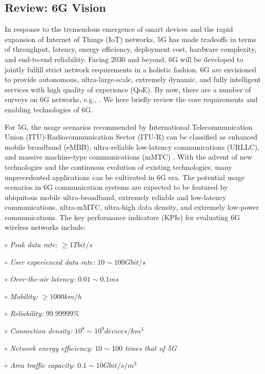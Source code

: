 \documentclass[journal,comsoc]{IEEEtran}
\begin{document}
\subsection{Review: 6G Vision}
In response to the tremendous emergence of smart devices and the rapid expansion of Internet of Things (IoT) networks, 5G has made tradeoffs in terms of throughput, latency, energy efficiency, deployment cost, hardware complexity, and end-to-end reliability. Facing 2030 and beyond, 6G will be developed to jointly fulfill strict network requirements in a holistic fashion. 6G are envisioned to provide autonomous, ultra-large-scale, extremely dynamic, and fully intelligent services with high quality of experience (QoE). By now, there are a number of surveys on 6G networks, e.g.,  \cite{6G-Wireless-Networks-MVT-2019,A-Vision-6G-MNET-2020,Toward-6G-Networks-MCOM-2020,6G-Wireless-Systems-JPROC-2021,On-the-Road-to-6G}. We here briefly review the core requirements and enabling technologies of 6G.

For 5G, the usage scenarios recommended by International Telecommunication Union (ITU)-Radiocommunication Sector (ITU-R) can be classified as enhanced mobile broadband (eMBB), ultra-reliable low-latency communications (URLLC), and massive machine-type communications (mMTC) \cite{IMT2020-2015}. With the advent of new technologies and the continuous evolution of existing technologies, many unprecedented applications can be cultivated in 6G era. The potential usage scenarios in 6G communication systems are expected to be featured by ubiquitous mobile ultra-broadband, extremely reliable and low-latency communications, ultra-mMTC, ultra-high data density, and extremely low-power communications. The key performance indicators (KPIs) for evaluating 6G wireless networks include:

$\circ$ \emph{Peak data rate: $\ge 1 Tbit/s$}

$\circ$ \emph{User experienced data rate: $10\sim100 Gbit/s$}

$\circ$ \emph{Over-the-air latency: $0.01\sim0.1 ms$}

$\circ$ \emph{Mobility: $\ge 1000 km/h$}

$\circ$ \emph{Reliability: $ 99.99999\%$}

$\circ$ \emph{Connection density: $10^8\sim10^9 devices/km^3$}

$\circ$ \emph{Network energy efficiency: $10\sim100$ times that of 5G}

$\circ$ \emph{Area traffic capacity: $0.1\sim10 Gbit/s/m^3$}
\end{document}
